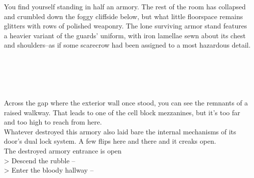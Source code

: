 You find yourself standing in half an armory. The rest of the room has collapsed and crumbled down the foggy cliffside below, but what little floorspace remains glitters with rows of polished weaponry. The lone surviving armor stand features a heavier variant of the guards' uniform, with iron lamellae sewn about its chest and shoulders--as if some scarecrow had been assigned to a most hazardous detail.\\
\\
\\
\\
\\
\\

Across the gap where the exterior wall once stood, you can see the remnants of a raised walkway. That leads to one of the cell block mezzanines, but it's too far and too high to reach from here.\\

Whatever destroyed this armory also laid bare the internal mechanisms of its door's dual lock system. A few flips here and there and it creaks open.\\
 The destroyed armory entrance is open\\

> Descend the rubble -- \\
> Enter the bloody hallway -- 